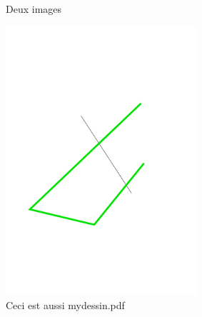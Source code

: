 \documentclass[french]{article}
\begin{document}
\begin{figure}[t]
    \centering
    \caption{Deux images}\label{fig-double}
\end{figure}




\begin{figure}[!h]
\centering
\includegraphics[width=200pt]{mydessin.pdf}
\caption{Ceci est aussi mydessin.pdf}
\label{mydessin2}
\end{figure}
\end{document}
